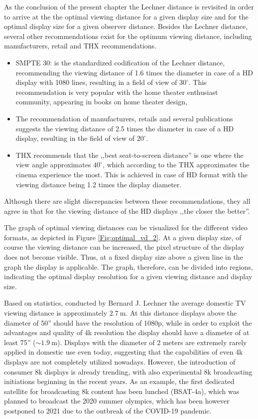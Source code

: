 As the conclusion of the present chapter the Lechner distance is revisited in order to arrive at the the optimal viewing distance for a given display size and for the optimal display size for a given observer distance.
Besides the Lechner distance, several other recommendations exist for the optimum viewing distance, including manufacturers, retail and THX recommendations.
\begin{itemize}
\item SMPTE 30: is the standardized codification of the Lechner distance, recommending the viewing distance of 1.6 times the diameter in case of a HD display with 1080 lines, resulting in a field of view of $30^{\circ}$.
This recommendation is very popular with the home theater enthusiast community, appearing in books on home theater design,
%
\item The recommendation of manufacturers, retails and several publications suggests the viewing distance of 2.5 times the diameter in case of a HD display, resulting in the field of view of $20^{\circ}$.
%
\item THX recommends that the ,,best seat-to-screen distance'' is one where the view angle approximates $40^{\circ}$, which according to the THX approximates the cinema experience the most.
This is achieved in case of HD format with the viewing distance being 1.2 times the display diameter.
\end{itemize}
Although there are slight discrepancies between these recommendations, they all agree in that for the viewing distance of the HD displays ,,the closer the better''.

The graph of optimal viewing distances can be visualized for the different video formats, as depicted in Figure \ref{Fig:optimal_vd_2}.
At a given display size, of course the viewing distance can be increased, the pixel structure of the display does not become visible.
Thus, at a fixed display size above a given line in the graph the display is applicable.
The graph, therefore, can be divided into regions, indicating the optimal display resolution for a given viewing distance and display size.

\vspace{3mm}
Based on statistics, conducted by Bernard J. Lechner the average domestic TV viewing distance is approximately $2.7~\mathrm{m}$.
At this distance displays above the diameter of 50'' should have the resolution of 1080p, while in order to exploit the advantages and quality of 4k resolution the display should have a diameter of at least 75'' ($\sim 1.9~\mathrm{m}$).
Displays with the diameter of 2 meters are extremely rarely applied in domestic use even today, suggesting that the capabilities of even 4k displays are not completely utilized nowadays.
However, the introduction of consumer 8k displays is already trending, with also experimental 8k broadcasting initiations beginning in the recent years.
As an example, the first dedicated satellite for broadcasting 8k content has been lunched (BSAT-4a), which was planned to broadcast the 2020 summer olympics, which has been however postponed to 2021 due to the outbreak of the COVID-19 pandemic.

